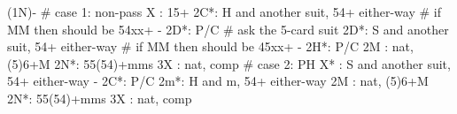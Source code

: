 (1N)-
# case 1: non-pass
X  : 15+
2C*: H and another suit, 54+ either-way  # if MM then should be 54xx+
   - 2D*: P/C  # ask the 5-card suit
2D*: S and another suit, 54+ either-way  # if MM then should be 45xx+
   - 2H*: P/C
2M : nat, (5)6+M
2N*: 55(54)+mms
3X : nat, comp
# case 2: PH
X* : S and another suit, 54+ either-way
   - 2C*: P/C
2m*: H and m, 54+ either-way
2M : nat, (5)6+M
2N*: 55(54)+mms
3X : nat, comp
